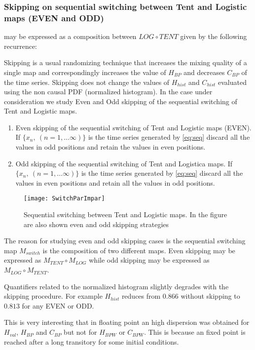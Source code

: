 \subsubsection{Skipping on sequential switching between Tent and Logistic maps (EVEN and ODD)} \label{sssec:skipp}

may be expressed as a composition between $LOG \circ TENT$ given by the following recurrence:

Skipping is a usual randomizing technique that increases the mixing quality of a single map and correspondingly increases the value of $H_{BP}$ and decreases $C_{BP} $ of the time series.
Skipping does not change the values of $H_{hist}$ and $C_{hist}$ evaluated using the non causal PDF (normalized histogram)\cite{DeMicco2008}.
In the case under consideration we study Even and Odd skipping of the sequential switching of Tent and Logistic maps.


\begin{enumerate}
	\item Even skipping of the sequential switching of Tent and Logistic maps (EVEN).\\
	If $\{x_n,~(n=1,...\infty)\}$ is the time series generated by \ref{eq:seq} discard all the values in odd positions and retain the values in even positions.
	\item Odd skipping of the sequential switching of Tent and Logistica maps.
	If $\{x_n,~(n=1,...\infty)\}$ is the time series generated by \ref{eq:seq} discard all the values in even positions and retain all the values in odd positions.
\end{enumerate}

\begin{figure}
	\texttt{[image: SwitchParImpar]}
	\caption{Sequential switching between Tent and Logistic maps. In the figure are also shown even and odd skipping strategies} \label{fig:seq}
\end{figure}

The reason for studying even and odd skipping cases is the sequential switching map $M_{switch}$ is the composition of two different maps. Even skipping may be expressed as $M_{TENT}\circ M_{LOG}$ while odd skipping may be expressed as $M_{LOG}\circ M_{TENT}$.

Quantifiers related to the normalized histogram slightly degrades with the skipping procedure. For example $H_{hist}$ reduces from $0.866$ without skipping to $0.813$ for any EVEN or ODD. 

This is very interesting that in floating point an high dispersion was obtained for $H_{val}$, $H_{BP}$ and $C_{BP}$ but not for $H_{BPW}$ or $C_{BPW}$.
This is because an fixed point is reached after a long transitory for some initial conditions.

